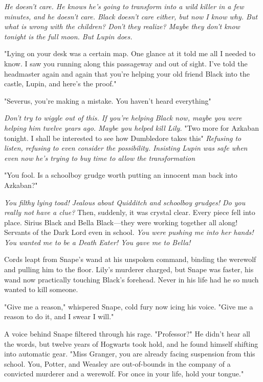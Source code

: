 \emph{He doesn't care. He knows he's going to transform into a wild killer in a few minutes, and he doesn't care. Black doesn't care either, but now I know why. But what is wrong with the children? Don't they realize{\el}? Maybe they don't know tonight is the full moon. But Lupin does.}

"Lying on your desk was a certain map. One glance at it told me all I needed to know. I saw you running along this passageway and out of sight. I've told the headmaster again and again that you're helping your old friend Black into the castle, Lupin, and here's the proof."

"Severus, you're making a mistake. You haven't heard everything{\el}"

\emph{Don't try to wiggle out of this. If you're helping Black now, maybe you were helping him twelve years ago. Maybe you helped kill Lily.} "Two more for Azkaban tonight. I shall be interested to see how Dumbledore takes this{\el}" \emph{Refusing to listen, refusing to even consider the possibility. Insisting Lupin was safe when even now he's trying to buy time to allow the transformation{\el}}

"You fool. Is a schoolboy grudge worth putting an innocent man back into Azkaban?"

\emph{You filthy lying toad! Jealous about Quidditch and schoolboy grudges! Do you really not have a clue?} Then, suddenly, it was crystal clear. Every piece fell into place. Sirius Black and Bella Black—they were working together all along! Servants of the Dark Lord even in school. \emph{You were pushing me into her hands! You wanted me to be a Death Eater! You gave me to Bella!}

Cords leapt from Snape's wand at his unspoken command, binding the werewolf and pulling him to the floor. Lily's murderer charged, but Snape was faster, his wand now practically touching Black's forehead. Never in his life had he so much wanted to kill someone.

"Give me a reason," whispered Snape, cold fury now icing his voice. "Give me a reason to do it, and I swear I will."

A voice behind Snape filtered through his rage. "Professor{\el}?" He didn't hear all the words, but twelve years of Hogwarts took hold, and he found himself shifting into automatic gear. "Miss Granger, you are already facing suspension from this school. You, Potter, and Weasley are out-of-bounds in the company of a convicted murderer and a werewolf. For once in your life, hold your tongue."

